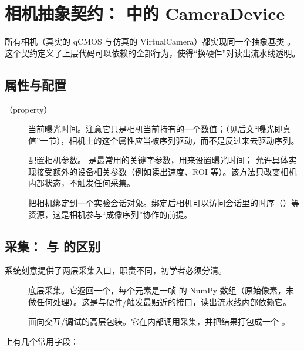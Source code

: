 \documentclass[11pt,oneside,openany]{book}
\begin{document}
\section{相机抽象契约： 中的 CameraDevice}

所有相机（真实的 qCMOS 与仿真的 VirtualCamera）都实现同一个抽象基类 。这个契约定义了上层代码可以依赖的全部行为，使得“换硬件”对读出流水线透明。

\subsection{属性与配置}

\begin{description}
\item[（property）] 当前曝光时间。注意它只是相机当前持有的一个数值；（见后文“曝光即真值”一节），相机上的这个属性应当被序列驱动，而不是反过来去驱动序列。
\item[] 配置相机参数。 是最常用的关键字参数，用来设置曝光时间； 允许具体实现接受额外的设备相关参数（例如读出速度、ROI 等）。该方法只改变相机内部状态，不触发任何采集。
\item[] 把相机绑定到一个实验会话对象。绑定后相机可以访问会话里的时序（）等资源，这是相机参与“成像序列”协作的前提。
\end{description}

\subsection{采集： 与  的区别}

系统刻意提供了两层采集入口，职责不同，初学者必须分清。

\begin{description}
\item[] 底层采集。它返回一个，每个元素是一帧  的 NumPy 数组（原始像素，未做任何处理）。这是与硬件/触发最贴近的接口，读出流水线内部依赖它。
\item[] 面向交互/调试的高层包装。它在内部调用采集，并把结果打包成一个 。
\end{description}

 上有几个常用字段：
\end{document}
